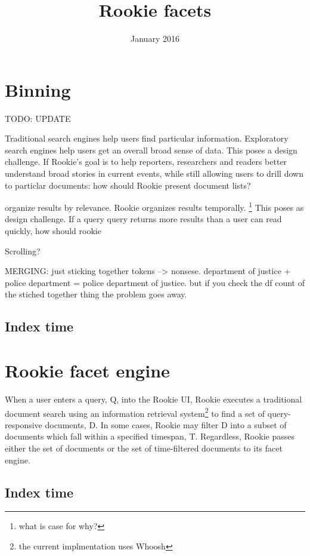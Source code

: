 \documentclass{article}
\title{Rookie facets}
\author{}
\date{January 2016}
\begin{document}
\maketitle

\section{Binning}

TODO: UPDATE

Traditional search engines help users find particular information. Exploratory search engines help users get an overall broad sense of data. This poses a design challenge. If Rookie's goal is to help reporters, researchers and readers better understand broad stories in current events, while still allowing users to drill down to particlar documents: how should Rookie present document lists?

organize results by relevance. Rookie organizes results temporally. \footnote{what is case for why?} This poses as design challenge. If a query query returns more results than a user can read quickly, how should rookie 

Scrolling?

MERGING: just sticking together tokens --> nonsese. department of justice + police department = police department of justice. but if you check the df count of the stiched together thing the problem goes away.

\subsection{Index time}



\section{Rookie facet engine}

When a user enters a query, Q, into the Rookie UI, Rookie executes a traditional document search using an information retrieval system\footnote {the current implmentation uses Whoosh} to find a set of query-responsive documents, D. In some cases, Rookie may filter D into a subset of documents which fall within a specified timespan, T. Regardless, Rookie passes either the set of documents or the set of time-filtered documents to its facet engine.

\subsection{Index time}
\end{document}
